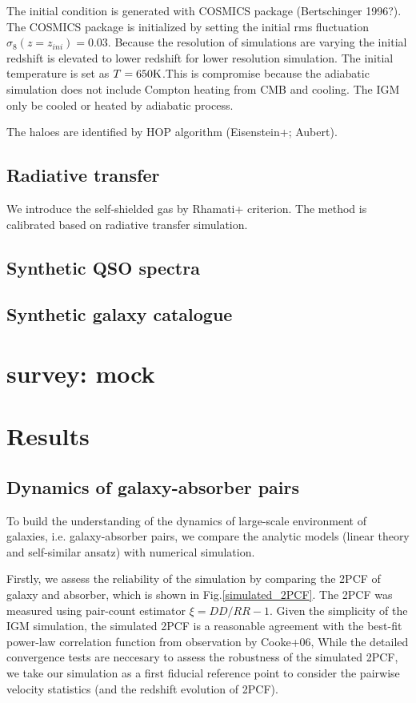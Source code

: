\documentclass[useAMS,usenatbib,twocolumn]{mn2e}
\begin{document}
The initial condition is generated with COSMICS package (Bertschinger 1996?). 
The COSMICS package is initialized by setting the initial rms fluctuation 
$\sigma_8(z=z_{ini})=0.03$. Because the resolution of simulations are varying 
the initial redshift is elevated to lower redshift for lower resolution 
simulation. The initial temperature is set as $T=650\rm{K}$.This is compromise 
because the adiabatic simulation does not include Compton heating from CMB and 
cooling. The IGM only be cooled or heated by adiabatic process.

The haloes are identified by HOP algorithm (Eisenstein+; Aubert).

\subsection{Radiative transfer}
We introduce the self-shielded gas by Rhamati+ criterion. The method
is calibrated based on radiative transfer simulation.

\subsection{Synthetic QSO spectra}

\subsection{Synthetic galaxy catalogue}


\section{survey: mock}






\section{Results}
\subsection{Dynamics of galaxy-absorber pairs}
To build the understanding of the dynamics of large-scale environment
of galaxies, i.e. galaxy-absorber pairs, we compare the 
analytic models (linear theory and self-similar ansatz) with 
numerical simulation.  

Firstly, we assess the reliability of the simulation by comparing 
the 2PCF of galaxy and absorber, which is shown in Fig.\ref{simulated_2PCF}.
The 2PCF was measured using pair-count estimator $\xi=DD/RR-1$.
Given the simplicity of the IGM simulation,
the simulated 2PCF is a reasonable agreement with the best-fit power-law
correlation function from observation by Cooke+06, While the detailed
convergence tests are neccesary to assess the robustness of the simulated
2PCF, we take our simulation as a first fiducial reference point to
consider the pairwise velocity statistics (and the redshift evolution of 2PCF).
\end{document}
